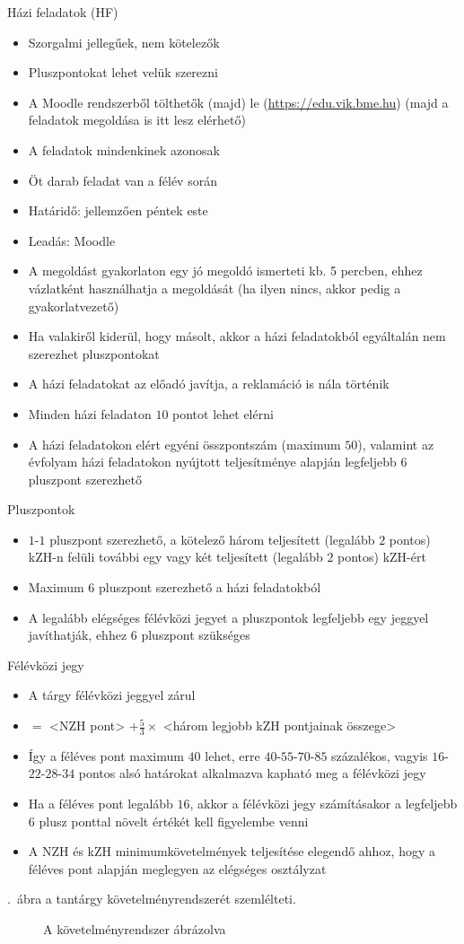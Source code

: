 \documentclass[a4paper,12pt]{article}
\begin{document}
	Házi feladatok (HF)
	\begin{itemize}
		\item Szorgalmi jellegűek, nem kötelezők
		\item Pluszpontokat lehet velük szerezni
		\item A Moodle rendszerből tölthetők (majd) le (\url{https://edu.vik.bme.hu}) (majd a feladatok megoldása is itt lesz elérhető)
		\item A feladatok mindenkinek azonosak
		\item Öt darab feladat van a félév során
		\item Határidő: jellemzően péntek este
		\item Leadás: Moodle
		\item A megoldást gyakorlaton egy jó megoldó ismerteti kb. 5 percben, ehhez vázlatként használhatja a megoldását (ha ilyen nincs, akkor pedig a gyakorlatvezető)
		\item Ha valakiről kiderül, hogy másolt, akkor a házi feladatokból egyáltalán nem szerezhet pluszpontokat
		\item A házi feladatokat az előadó javítja, a reklamáció is nála történik
		\item Minden házi feladaton $10$ pontot lehet elérni
		\item A házi feladatokon elért egyéni összpontszám (maximum $50$), valamint az évfolyam házi feladatokon nyújtott teljesítménye alapján legfeljebb $6$ pluszpont szerezhető
	\end{itemize}
	Pluszpontok
	\begin{itemize}
		\item $1$-$1$ pluszpont szerezhető, a kötelező három teljesített (legalább $2$ pontos) kZH-n felüli további egy vagy két teljesített (legalább $2$ pontos) kZH-ért
		\item Maximum $6$ pluszpont szerezhető a házi feladatokból
		\item A legalább elégséges félévközi jegyet a pluszpontok legfeljebb egy jeggyel javíthatják, ehhez $6$ pluszpont szükséges
	\end{itemize}
	Félévközi jegy
	\begin{itemize}
		\item A tárgy félévközi jeggyel zárul
		\item <Féléves pont> $=$ <NZH pont> $+\frac{5}{3}\times$ <három legjobb kZH pontjainak összege>
		\item Így a féléves pont maximum $40$ lehet, erre $40$-$55$-$70$-$85$ százalékos, vagyis $16$-$22$-$28$-$34$ pontos alsó határokat alkalmazva kapható meg a félévközi jegy
		\item Ha a féléves pont legalább $16$, akkor a félévközi jegy számításakor a legfeljebb $6$ plusz ponttal növelt értékét kell figyelembe venni
		\item A NZH és kZH minimumkövetelmények teljesítése elegendő ahhoz, hogy a féléves pont alapján meglegyen az elégséges osztályzat
	\end{itemize}
	\Az{\ref{fig:pontrendszer}}.~ábra a tantárgy követelményrendszerét szemlélteti.
	\begin{landscape}
		\begin{figure}[h]
			
			\caption{A követelményrendszer ábrázolva}
			\label{fig:pontrendszer}
		\end{figure}
	\end{landscape}
\end{document}
